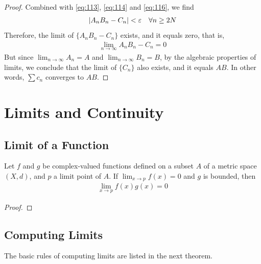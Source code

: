 \documentclass[thmcnt=section, 12pt]{my-elegantbook}
\begin{document}
\begin{proof}
    Combined with \eqref{eq:113}, \eqref{eq:114} and \eqref{eq:116}, we find 
    \begin{align*}
        \left\lvert A_n B_n - C_n \right\rvert < \varepsilon
        \quad 
        \forall n \geq 2N
    \end{align*}
    Therefore, the limit of $\{ A_n B_n - C_n \}$ exists, and it equals zero, that is, 
    \begin{align*}
        \lim_{n \to \infty} A_n B_n - C_n = 0
    \end{align*}
    But since $\lim_{n \to \infty} A_n = A$ and $\lim_{n \to \infty} B_n = B$, by the algebraic properties of limits, we conclude that the limit of $\{C_n\}$ also exists, and it equals $AB$. In other words, $\sum c_n$ converges to $AB$.
\end{proof}


\chapter{Limits and Continuity}


\section{Limit of a Function}

\begin{proposition} \label{pro:2}
    Let $f$ and $g$ be complex-valued functions defined on a subset $A$ of a metric space $(X, d)$, and $p$ a limit point of $A$. If $\lim_{x \to p} f(x) = 0$ and $g$ is bounded, then 
    \begin{align*}
        \lim_{x \to p} f(x)g(x) = 0
    \end{align*}
\end{proposition}

\begin{proof}
\end{proof}


\section{Computing Limits}

The basic rules of computing limits are listed in the next theorem.
\end{document}
